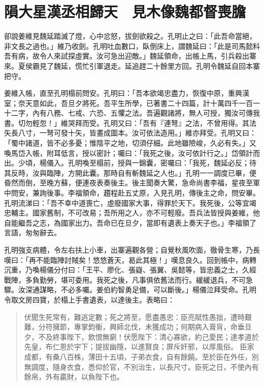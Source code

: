 
\chapter{隕大星漢丞相歸天　見木像魏都督喪膽}

卻說姜維見魏延踏滅了燈，心中忿怒，拔劍欲殺之。孔明止之曰：「此吾命當絕，非文長之過也。」維乃收劍。孔明吐血數口，臥倒床上，謂魏延曰：「此是司馬懿料吾有病，故令人來試探虛實。汝可急出迎敵。」魏延領命，出帳上馬，引兵殺出寨來。夏侯霸見了魏延，慌忙引軍退走。延追趕二十餘里方回。孔明令魏延自回本寨把守。

姜維入帳，直至孔明榻前問安。孔明曰：「吾本欲竭忠盡力，恢復中原，重興漢室；奈天意如此，吾旦夕將死。吾平生所學，已著書二十四篇，計十萬四千一百一十二字，內有八務、七戒、六恐、五懼之法。吾遍觀諸將，無人可授，獨汝可傳我書。切勿輕忽！」維哭拜而受。孔明又曰：「吾有『連弩』之法，不曾用得。其法矢長八寸，一弩可發十矢，皆畫成圖本。汝可依法造用。」維亦拜受。孔明又曰：「蜀中諸道，皆不必多憂；惟陰平之地，切須仔細。此地雖險峻，久必有失。」又喚馬岱入帳，附耳低言，授以密計；囑曰：「我死之後，汝可依計行之。」岱領計而出。少頃，楊儀入。孔明喚至榻前，授與一錦囊，密囑曰：「我死，魏延必反；待其反時，汝與臨陣，方開此囊。那時自有斬魏延之人也。」孔明一一調度已畢，便昏然而倒，至晚方蘇，便連夜表奏後主。後主聞奏大驚，急命尚書李福，星夜至軍中問安，兼詢後事。李福領命，趲程赴五丈原，入見孔明，傳後主之命，問安畢。孔明流涕曰：「吾不幸中道喪亡，虛廢國家大事，得罪於天下。我死後，公等宜竭忠輔主。國家舊制，不可改易；吾所用之人，亦不可輕廢。吾兵法皆授與姜維，他自能繼吾之志，為國家出力。吾命已在旦夕，當即有遺表上奏天子也。」李福領了言語，匆匆辭去。

孔明強支病體，令左右扶上小車，出寨遍觀各營；自覺秋風吹面，徹骨生寒，乃長嘆曰：「再不能臨陣討賊矣！悠悠蒼天，曷此其極！」嘆息良久。回到帳中，病轉沉重，乃喚楊儀分付曰：「王平、廖化、張嶷、張翼、吳懿等，皆忠義之士，久經戰陣，多負勤勞，堪可委用。我死之後，凡事俱依舊法而行。緩緩退兵，不可急驟。汝深通謀略，不必多囑。姜伯約智勇足備，可以斷後。」楊儀泣拜受命。孔明令取文房四寶，於榻上手書遺表，以達後主。表略曰：

\begin{quote}
伏聞生死常有，難逃定數；死之將至，愿盡愚忠：臣亮賦性愚拙，遭時艱難，分符擁節，專掌鈞衡，興師北伐，未獲成功；何期病入膏肓，命垂旦夕，不及終事陛下，飲恨無窮！伏愿陛下：清心寡欲，約己愛民；達孝道於先皇，布仁恩於宇下；提拔幽隱，以進賢良；屏斥奸邪，以厚風俗。
臣家成都，有桑八百株，薄田十五頃，子弟衣食，自有餘饒。至於臣在外任，別無調度，隨身衣食，悉仰於官，不別治生，以長尺寸。臣死之日，不使內有餘帛，外有贏財，以負陛下也。
\end{quote}

